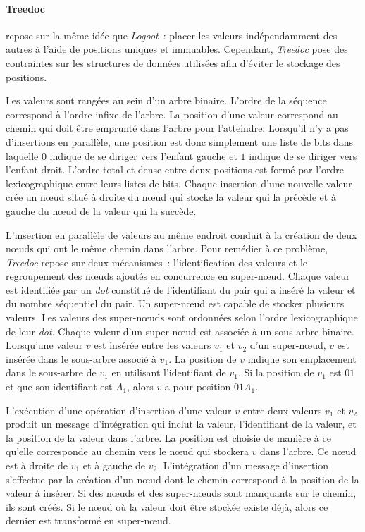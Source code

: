 \paragraph{Treedoc}\autocite{preguica_2009_treedoc} repose sur la même idée que \emph{Logoot}~: placer les valeurs indépendamment des autres à l'aide de positions uniques et immuables.
Cependant, \emph{Treedoc} pose des contraintes sur les structures de données utilisées afin d'éviter le stockage des positions.

Les valeurs sont rangées au sein d'un arbre binaire.
L'ordre de la séquence correspond à l'ordre infixe de l'arbre.
La position d'une valeur correspond au chemin qui doit être emprunté dans l'arbre pour l'atteindre.
Lorsqu'il n'y a pas d'insertions en parallèle, une position est donc simplement une liste de bits dans laquelle $0$ indique de se diriger vers l'enfant gauche et $1$ indique de se diriger vers l'enfant droit.
L'ordre total et dense entre deux positions est formé par l'ordre lexicographique entre leurs listes de bits.
Chaque insertion d'une nouvelle valeur crée un nœud situé à droite du nœud qui stocke la valeur qui la précède et à gauche du nœud de la valeur qui la succède.

L'insertion en parallèle de valeurs au même endroit conduit à la création de deux nœuds qui ont le même chemin dans l'arbre.
Pour remédier à ce problème, \emph{Treedoc} repose sur deux mécanismes~: l'identification des valeurs et le regroupement des nœuds ajoutés en concurrence en super-nœud.
Chaque valeur est identifiée par un \emph{dot} constitué de l'identifiant du pair qui a inséré la valeur et du nombre séquentiel du pair.
Un super-nœud est capable de stocker plusieurs valeurs.
Les valeurs des super-nœuds sont ordonnées selon l'ordre lexicographique de leur \emph{dot}.
Chaque valeur d'un super-nœud est associée à un sous-arbre binaire.
Lorsqu'une valeur $v$ est insérée entre les valeurs $v_1$ et $v_2$ d'un super-nœud, $v$ est insérée dans le sous-arbre associé à $v_1$.
La position de $v$ indique son emplacement dans le sous-arbre de $v_1$ en utilisant l'identifiant de $v_1$.
Si la position de $v_1$ est $01$ et que son identifiant est $A_1$, alors $v$ a pour position $01A_1$.

L'exécution d'une opération d'insertion d'une valeur $v$ entre deux valeurs $v_1$ et $v_2$ produit un message d'intégration qui inclut la valeur, l'identifiant de la valeur, et la position de la valeur dans l'arbre.
La position est choisie de manière à ce qu'elle corresponde au chemin vers le nœud qui stockera $v$ dans l'arbre.
Ce nœud est à droite de $v_1$ et à gauche de $v_2$.
L'intégration d'un message d'insertion s'effectue par la création d'un nœud dont le chemin correspond à la position de la valeur à insérer.
Si des nœuds et des super-nœuds sont manquants sur le chemin, ils sont créés.
Si le nœud où la valeur doit être stockée existe déjà, alors ce dernier est transformé en super-nœud.

